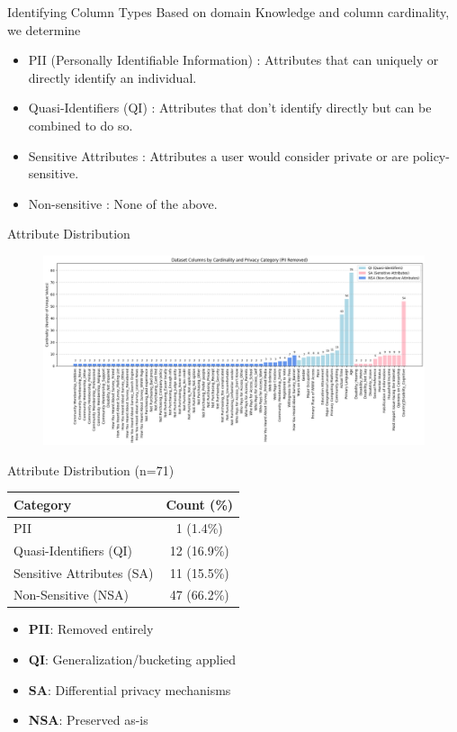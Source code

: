 \documentclass{beamer}
\begin{document}
\begin{frame}{Identifying Column Types}
 Based on domain Knowledge and column cardinality, we determine
\begin{itemize}
    \item PII (Personally Identifiable Information) : Attributes that can uniquely or directly identify an individual.
\item Quasi-Identifiers (QI) : Attributes that don’t identify directly but can be combined to do so.
\item Sensitive Attributes : Attributes a user would consider private or are policy-sensitive.
\item Non-sensitive : None of the above.
\end{itemize}
\end{frame}

\begin{frame}{Attribute Distribution}
\begin{figure}
    \centering
    \includegraphics[width=1.06\textwidth]{slide_image/col_type.png}
\end{figure}
\end{frame}

\begin{frame}{Attribute Distribution (n=71)}
\begin{table}[h]
\centering
\small %
\begin{tabular}{|l|c|}
\hline
\textbf{Category} & \textbf{Count (\%)} \\ \hline
PII & 1 (1.4\%) \\ \hline
Quasi-Identifiers (QI) & 12 (16.9\%) \\ \hline
Sensitive Attributes (SA) & 11 (15.5\%) \\ \hline
Non-Sensitive (NSA) & 47 (66.2\%) \\ \hline
\end{tabular}
\end{table}

\vspace{0.5em}
\begin{itemize}
\item \textbf{PII}: Removed entirely
\item \textbf{QI}: Generalization/bucketing applied
\item \textbf{SA}: Differential privacy mechanisms
\item \textbf{NSA}: Preserved as-is
\end{itemize}
\end{frame}
\end{document}
